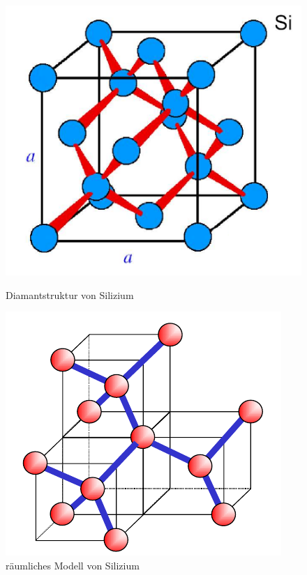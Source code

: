 				
	\begin{figure}[h!]
		\centering
		\begin{minipage}[t]{0.45\linewidth}
			\centering
			\includegraphics[width=\linewidth]{Kapitel/Kap02/Diamantstruktur_SI.PNG}
			\caption{Diamantstruktur von Silizium}
			\label{02_diamStruktur}
		\end{minipage}%
		\hfill
		\begin{minipage}[t]{0.45\linewidth}
			\centering
			\includegraphics[width=\linewidth]{Kapitel/Kap02/raeumlichesModell_SI.PNG}
			\caption{räumliches Modell von Silizium}
			\label{02_raeumlModell}
		\end{minipage}
	\end{figure}

